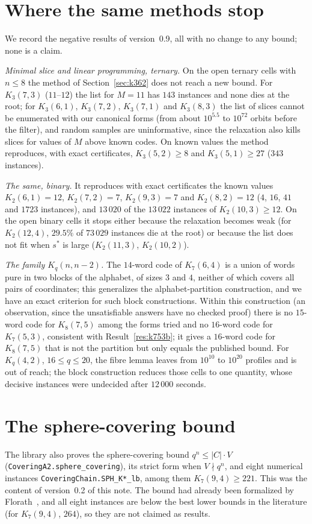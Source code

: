 \documentclass[11pt]{amsart}
\theoremstyle{definition}
\theoremstyle{remark}
\begin{document}
\section{Where the same methods stop}\label{sec:limits}
We record the negative results of version~0.9, all with no change to any bound; none is a claim.

\emph{Minimal slice and linear programming, ternary.} On the open ternary cells with $n\le 8$ the method of Section~\ref{sec:k362} does not reach a new bound. For $K_3(7,3)$ ($11$--$12$) the list for $M=11$ has $143$ instances and none dies at the root; for $K_3(6,1)$, $K_3(7,2)$, $K_3(7,1)$ and $K_3(8,3)$ the list of slices cannot be enumerated with our canonical forms (from about $10^{5.5}$ to $10^{72}$ orbits before the filter), and random samples are uninformative, since the relaxation also kills slices for values of $M$ above known codes. On known values the method reproduces, with exact certificates, $K_3(5,2)\ge 8$ and $K_3(5,1)\ge 27$ ($343$ instances).

\emph{The same, binary.} It reproduces with exact certificates the known values $K_2(6,1)=12$, $K_2(7,2)=7$, $K_2(9,3)=7$ and $K_2(8,2)=12$ ($4$, $16$, $41$ and $1723$ instances), and $13\,020$ of the $13\,022$ instances of $K_2(10,3)\ge 12$. On the open binary cells it stops either because the relaxation becomes weak (for $K_2(12,4)$, $29.5\%$ of $73\,029$ instances die at the root) or because the list does not fit when $s^*$ is large ($K_2(11,3)$, $K_2(10,2)$).

\emph{The family $K_q(n,n-2)$.} The $14$-word code of $K_7(6,4)$ is a union of words pure in two blocks of the alphabet, of sizes $3$ and $4$, neither of which covers all pairs of coordinates; this generalizes the alphabet-partition construction, and we have an exact criterion for such block constructions. Within this construction (an observation, since the unsatisfiable answers have no checked proof) there is no $15$-word code for $K_8(7,5)$ among the forms tried and no $16$-word code for $K_7(5,3)$, consistent with Result~\ref{res:k753b}; it gives a $16$-word code for $K_8(7,5)$ that is not the partition but only equals the published bound. For $K_q(4,2)$, $16\le q\le 20$, the fibre lemma leaves from $10^{10}$ to $10^{20}$ profiles and is out of reach; the block construction reduces those cells to one quantity, whose decisive instances were undecided after $12\,000$ seconds.

\section{The sphere-covering bound}
The library also proves the sphere-covering bound $q^n\le |C|\cdot V$ (\texttt{CoveringA2.\allowbreak sphere\_\allowbreak covering}), its strict form when $V\nmid q^n$, and eight numerical instances \texttt{CoveringChain.\allowbreak SPH\_\allowbreak K*\_\allowbreak lb}, among them $K_7(9,4)\ge 221$.
This was the content of version~0.2 of this note.
The bound had already been formalized by Florath~\cite{florath2026}, and all eight instances are below the best lower bounds in the literature (for $K_7(9,4)$, $264$), so they are not claimed as results.
\end{document}
